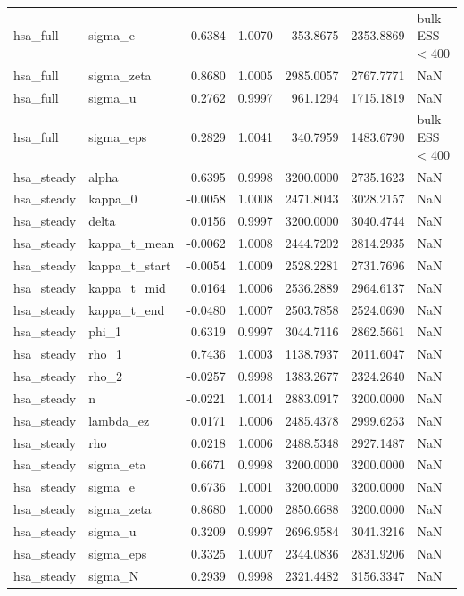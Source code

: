 \begin{tabular}{llrrrrl}
hsa\_full & sigma\_e & 0.6384 & 1.0070 & 353.8675 & 2353.8869 & bulk ESS < 400 \\
hsa\_full & sigma\_zeta & 0.8680 & 1.0005 & 2985.0057 & 2767.7771 & NaN \\
hsa\_full & sigma\_u & 0.2762 & 0.9997 & 961.1294 & 1715.1819 & NaN \\
hsa\_full & sigma\_eps & 0.2829 & 1.0041 & 340.7959 & 1483.6790 & bulk ESS < 400 \\
hsa\_steady & alpha & 0.6395 & 0.9998 & 3200.0000 & 2735.1623 & NaN \\
hsa\_steady & kappa\_0 & -0.0058 & 1.0008 & 2471.8043 & 3028.2157 & NaN \\
hsa\_steady & delta & 0.0156 & 0.9997 & 3200.0000 & 3040.4744 & NaN \\
hsa\_steady & kappa\_t\_mean & -0.0062 & 1.0008 & 2444.7202 & 2814.2935 & NaN \\
hsa\_steady & kappa\_t\_start & -0.0054 & 1.0009 & 2528.2281 & 2731.7696 & NaN \\
hsa\_steady & kappa\_t\_mid & 0.0164 & 1.0006 & 2536.2889 & 2964.6137 & NaN \\
hsa\_steady & kappa\_t\_end & -0.0480 & 1.0007 & 2503.7858 & 2524.0690 & NaN \\
hsa\_steady & phi\_1 & 0.6319 & 0.9997 & 3044.7116 & 2862.5661 & NaN \\
hsa\_steady & rho\_1 & 0.7436 & 1.0003 & 1138.7937 & 2011.6047 & NaN \\
hsa\_steady & rho\_2 & -0.0257 & 0.9998 & 1383.2677 & 2324.2640 & NaN \\
hsa\_steady & n & -0.0221 & 1.0014 & 2883.0917 & 3200.0000 & NaN \\
hsa\_steady & lambda\_ez & 0.0171 & 1.0006 & 2485.4378 & 2999.6253 & NaN \\
hsa\_steady & rho & 0.0218 & 1.0006 & 2488.5348 & 2927.1487 & NaN \\
hsa\_steady & sigma\_eta & 0.6671 & 0.9998 & 3200.0000 & 3200.0000 & NaN \\
hsa\_steady & sigma\_e & 0.6736 & 1.0001 & 3200.0000 & 3200.0000 & NaN \\
hsa\_steady & sigma\_zeta & 0.8680 & 1.0000 & 2850.6688 & 3200.0000 & NaN \\
hsa\_steady & sigma\_u & 0.3209 & 0.9997 & 2696.9584 & 3041.3216 & NaN \\
hsa\_steady & sigma\_eps & 0.3325 & 1.0007 & 2344.0836 & 2831.9206 & NaN \\
hsa\_steady & sigma\_N & 0.2939 & 0.9998 & 2321.4482 & 3156.3347 & NaN \\

\end{tabular}
